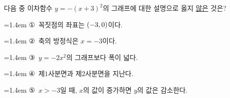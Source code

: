 다음 중 이차함수 $y=-(x+3)^2$의 그래프에 대한 설명으로 옳지 \underline{않은} 것은?
\par\medskip\par\noindent\hangindent=1.4em {\small ①}\ 꼭짓점의 좌표는 $(-3{,}\mkern3mu\mathopen{}0)$이다.\par\noindent\hangindent=1.4em {\small ②}\ 축의 방정식은 $x=-3$이다.\par\noindent\hangindent=1.4em {\small ③}\ $y=-2x^2$의 그래프보다 폭이 넓다.\par\noindent\hangindent=1.4em {\small ④}\ 제$1$사분면과 제$2$사분면을 지난다.\par\noindent\hangindent=1.4em {\small ⑤}\ $x>-3$일 때, $x$의 값이 증가하면 $y$의 값은 감소한다.\par\medskip
